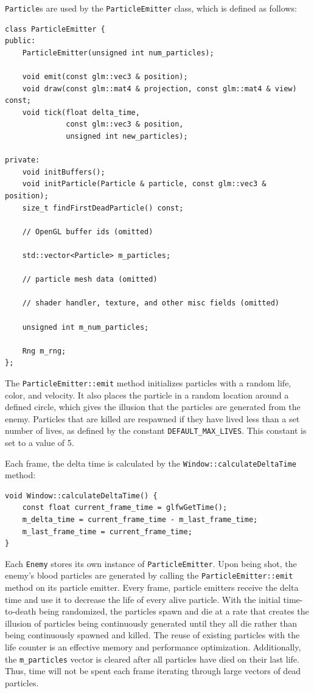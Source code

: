 \documentclass {article}
\begin{document}
\texttt{Particle}s are used by the \texttt{ParticleEmitter} class, which is defined as follows:
\begin{verbatim}
class ParticleEmitter {
public:
    ParticleEmitter(unsigned int num_particles);

    void emit(const glm::vec3 & position);
    void draw(const glm::mat4 & projection, const glm::mat4 & view) const;
    void tick(float delta_time,
              const glm::vec3 & position,
              unsigned int new_particles);

private:
    void initBuffers();
    void initParticle(Particle & particle, const glm::vec3 & position);
    size_t findFirstDeadParticle() const;

    // OpenGL buffer ids (omitted)

    std::vector<Particle> m_particles;

    // particle mesh data (omitted)

    // shader handler, texture, and other misc fields (omitted)

    unsigned int m_num_particles;

    Rng m_rng;
};
\end{verbatim}

The \texttt{ParticleEmitter::emit} method initializes particles with a random life, color, and velocity. It also places the particle in a random location around a defined circle, which gives the illusion that the particles are generated from the enemy. Particles that are killed are respawned if they have lived less than a set number of lives, as defined by the constant \texttt{DEFAULT\_MAX\_LIVES}. This constant is set to a value of 5.

Each frame, the delta time is calculated by the \texttt{Window::calculateDeltaTime} method:
\begin{verbatim}
void Window::calculateDeltaTime() {
    const float current_frame_time = glfwGetTime();
    m_delta_time = current_frame_time - m_last_frame_time;
    m_last_frame_time = current_frame_time;
}
\end{verbatim}

Each \texttt{Enemy} stores its own instance of \texttt{ParticleEmitter}. Upon being shot, the enemy's blood particles are generated by calling the \texttt{ParticleEmitter::emit} method on its particle emitter. Every frame, particle emitters receive the delta time and use it to decrease the life of every alive particle. With the initial time-to-death being randomized, the particles spawn and die at a rate that creates the illusion of particles being continuously generated until they all die rather than being continuously spawned and killed. The reuse of existing particles with the life counter is an effective memory and performance optimization. Additionally, the \texttt{m\_particles} vector is cleared after all particles have died on their last life. Thus, time will not be spent each frame iterating through large vectors of dead particles.
\end{document}
